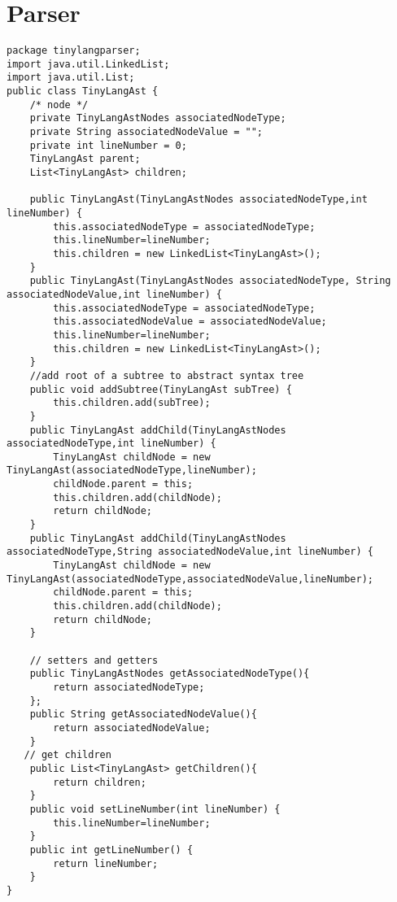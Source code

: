 \section{Parser}
\begin{lstlisting}[basicstyle=\miniscule,caption=general stuctures of an AST (\emph{class TinyLangAst}), label=listing:tree class implementation]
package tinylangparser;
import java.util.LinkedList;
import java.util.List;
public class TinyLangAst {
	/* node */
	private TinyLangAstNodes associatedNodeType;
	private String associatedNodeValue = ""; 
	private int lineNumber = 0;
    TinyLangAst parent;
    List<TinyLangAst> children;

    public TinyLangAst(TinyLangAstNodes associatedNodeType,int lineNumber) {
        this.associatedNodeType = associatedNodeType;
        this.lineNumber=lineNumber;
        this.children = new LinkedList<TinyLangAst>();
    }
    public TinyLangAst(TinyLangAstNodes associatedNodeType, String associatedNodeValue,int lineNumber) {
        this.associatedNodeType = associatedNodeType;
        this.associatedNodeValue = associatedNodeValue;
        this.lineNumber=lineNumber;
        this.children = new LinkedList<TinyLangAst>();
    }
    //add root of a subtree to abstract syntax tree
    public void addSubtree(TinyLangAst subTree) {
    	this.children.add(subTree);  
    }
    public TinyLangAst addChild(TinyLangAstNodes associatedNodeType,int lineNumber) {
    	TinyLangAst childNode = new TinyLangAst(associatedNodeType,lineNumber);
        childNode.parent = this;
        this.children.add(childNode);
        return childNode;
    }
    public TinyLangAst addChild(TinyLangAstNodes associatedNodeType,String associatedNodeValue,int lineNumber) {
    	TinyLangAst childNode = new TinyLangAst(associatedNodeType,associatedNodeValue,lineNumber);
        childNode.parent = this;
        this.children.add(childNode);
        return childNode;
    }

    // setters and getters
    public TinyLangAstNodes getAssociatedNodeType(){
    	return associatedNodeType;
    };
    public String getAssociatedNodeValue(){
    	return associatedNodeValue;
    }
   // get children
    public List<TinyLangAst> getChildren(){
    	return children;
    }
    public void setLineNumber(int lineNumber) {
    	this.lineNumber=lineNumber;   	
    }
    public int getLineNumber() {
    	return lineNumber; 	
    }
}
\end{lstlisting}

